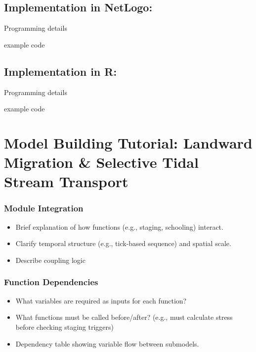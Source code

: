 \documentclass[
]{book}
\providecommand{\tightlist}{%
  \setlength{\itemsep}{0pt}\setlength{\parskip}{0pt}}
\begin{document}
\section{Implementation in NetLogo:}\label{implementation-in-netlogo}

Programming details

example code

\section{Implementation in R:}\label{implementation-in-r}

Programming details

example code

\chapter{Model Building Tutorial: Landward Migration \& Selective Tidal Stream Transport}\label{model-building-tutorial-landward-migration-selective-tidal-stream-transport}

\subsection{Module Integration}\label{module-integration-1}

\begin{itemize}
\tightlist
\item
  Brief explanation of how functions (e.g., staging, schooling) interact.
\item
  Clarify temporal structure (e.g., tick-based sequence) and spatial scale.
\item
  Describe coupling logic
\end{itemize}

\subsection{Function Dependencies}\label{function-dependencies-1}

\begin{itemize}
\item
  What variables are required as inputs for each function?
\item
  What functions must be called before/after? (e.g., must calculate stress before checking staging triggers)
\item
  Dependency table showing variable flow between submodels.
\end{itemize}
\end{document}
